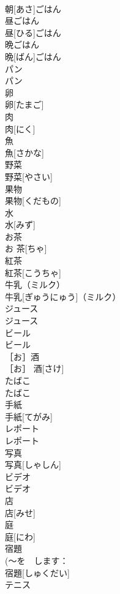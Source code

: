 \documentclass[8pt]{extreport}
\begin{document}
\begin{CJK}{UTF8}{min}
\\	朝[あさ]ごはん	
\\	昼ごはん	
\\	昼[ひる]ごはん	
\\	晩ごはん	
\\	晩[ばん]ごはん	
\\	パン	
\\	パン	
\\	卵	
\\	卵[たまご]	
\\	肉	
\\	肉[にく]	
\\	魚	
\\	魚[さかな]	
\\	野菜	
\\	野菜[やさい]	
\\	果物	
\\	果物[くだもの]	
\\	[お] 水	
\\	[お] 水[みず]	
\\	お茶	
\\	お 茶[ちゃ]	
\\	紅茶	
\\	紅茶[こうちゃ]	
\\	牛乳（ミルク）	
\\	牛乳[ぎゅうにゅう]（ミルク）	
\\	ジュース	
\\	ジュース	
\\	ビール	
\\	ビール	
\\	［お］酒	
\\	［お］ 酒[さけ]	
\\	たばこ	
\\	たばこ	
\\	手紙	
\\	手紙[てがみ]	
\\	レポート	
\\	レポート	
\\	写真	
\\	写真[しゃしん]	
\\	ビデオ	
\\	ビデオ	
\\	店	
\\	店[みせ]	
\\	庭	
\\	庭[にわ]	
\\	宿題	
\\	(～を　します：
\\	宿題[しゅくだい]	
\\	テニス	

\end{CJK}
\end{document}

